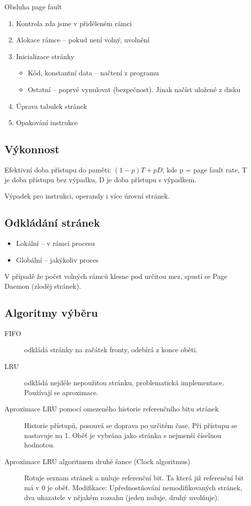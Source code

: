 \documentclass[a4paper, 11pt]{report}
\begin{document}
Obsluha page fault
\begin{enumerate}
	\item Kontrola zda jsme v přiděleném rámci
	\item Alokace rámce -- pokud není volný, uvolnění
	\item Inicializace stránky
	\begin{itemize}
		\item Kód, konstantní data -- načtení z programu
		\item Ostatní -- poprvé vynulovat (bezpečnost). Jinak načíst uložené z disku
	\end{itemize}
	\item Úprava tabulek stránek
	\item Opakování instrukce
\end{enumerate}

\subsection{Výkonnost}

Efektivní doba přístupu do paměti: $(1-p)T + pD$, kde p = page fault rate, T je doba přístupu bez výpadku, D  je doba přístupu s výpadkem.

Výpadek pro instrukci, operandy i více úrovní stránek. 

\subsection{Odkládání stránek}

\begin{itemize}
	\item Lokální -- v rámci procesu
	\item Globální -- jakýkoliv proces
\end{itemize}

V případě že počet volných rámců klesne pod určitou mez, spustí se Page Daemon (zloděj stránek).

\subsection{Algoritmy výběru}

\begin{description}
	\item[FIFO] odkládá stránky na začátek fronty, odebírá z konce oběti.
	\item[LRU] odkládá nejdéle nepoužitou stránku, problematická implementace. Používají se aproximace.
	\item[Aproximace LRU pomocí omezeného historie referenčního bitu stránek] Historie přístupů, posouvá se doprava po určitém čase. Při přístupu se nastavuje na 1. Oběť je vybrána jako stránka s nejmenší číselnou hodnotou.
	\item[Aproximace LRU algoritmem druhé šance (Clock algoritmus)] Rotuje seznam stránek a nuluje referenční bit. Ta která již referenční bit má v 0 je oběť. Modifikace: Upřednostňování nemodifikovaných stránek, dva ukazatele v nějakém rozsahu (jeden nuluje, druhý uvolňuje).
\end{description}
\end{document}
